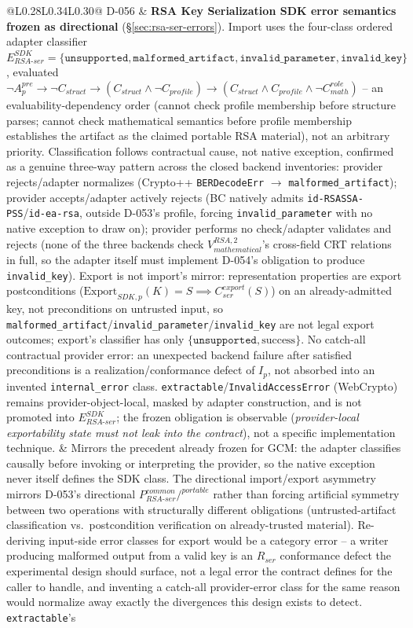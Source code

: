 \documentclass[11pt,a4paper]{article}
\begin{document}
\begin{longtable}{@{}L{0.28\textwidth}L{0.34\textwidth}L{0.30\textwidth}@{}}
D-056 & \textbf{RSA Key Serialization SDK error semantics frozen as directional} (\S\ref{sec:rsa-ser-errors}). Import uses the four-class ordered adapter classifier $E_{RSA\text{-}ser}^{SDK}=\{\texttt{unsupported},\texttt{malformed\_artifact},\texttt{invalid\_parameter},\texttt{invalid\_key}\}$, evaluated $\neg A_p^{pre} \to \neg C_{struct} \to (C_{struct}\wedge\neg C_{profile}) \to (C_{struct}\wedge C_{profile}\wedge\neg C_{math}^{role})$ -- an evaluability-dependency order (cannot check profile membership before structure parses; cannot check mathematical semantics before profile membership establishes the artifact as the claimed portable RSA material), not an arbitrary priority. Classification follows contractual cause, not native exception, confirmed as a genuine three-way pattern across the closed backend inventories: provider rejects/adapter normalizes (Crypto++ \texttt{BERDecodeErr} $\to$ \texttt{malformed\_artifact}); provider accepts/adapter actively rejects (BC natively admits \texttt{id-RSASSA-PSS}/\texttt{id-ea-rsa}, outside D-053's profile, forcing \texttt{invalid\_parameter} with no native exception to draw on); provider performs no check/adapter validates and rejects (none of the three backends check $V_{mathematical}^{RSA,2}$'s cross-field CRT relations in full, so the adapter itself must implement D-054's obligation to produce \texttt{invalid\_key}). Export is not import's mirror: representation properties are export postconditions ($\text{Export}_{SDK,p}(K)=S \implies C_{ser}^{export}(S)$) on an already-admitted key, not preconditions on untrusted input, so \texttt{malformed\_artifact}/\texttt{invalid\_parameter}/\texttt{invalid\_key} are not legal export outcomes; export's classifier has only $\{\texttt{unsupported},\text{success}\}$. No catch-all contractual provider error: an unexpected backend failure after satisfied preconditions is a realization/conformance defect of $I_p$, not absorbed into an invented \texttt{internal\_error} class. \texttt{extractable}/\texttt{InvalidAccessError} (WebCrypto) remains provider-object-local, masked by adapter construction, and is not promoted into $E_{RSA\text{-}ser}^{SDK}$; the frozen obligation is observable (\emph{provider-local exportability state must not leak into the contract}), not a specific implementation technique. & Mirrors the precedent already frozen for GCM: the adapter classifies causally before invoking or interpreting the provider, so the native exception never itself defines the SDK class. The directional import/export asymmetry mirrors D-053's directional $P_{RSA\text{-}ser}^{common}/^{portable}$ rather than forcing artificial symmetry between two operations with structurally different obligations (untrusted-artifact classification vs.\ postcondition verification on already-trusted material). Re-deriving input-side error classes for export would be a category error -- a writer producing malformed output from a valid key is an $R_{ser}$ conformance defect the experimental design should surface, not a legal error the contract defines for the caller to handle, and inventing a catch-all provider-error class for the same reason would normalize away exactly the divergences this design exists to detect. \texttt{extractable}'s 
\end{longtable}
\end{document}
